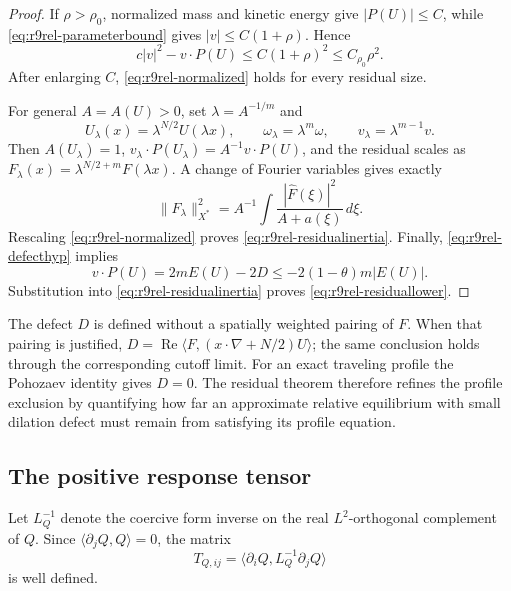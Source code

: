 \begin{proof}
If $\rho>\rho_0$, normalized mass and kinetic energy give
$|P(U)|\le C$, while \eqref{eq:r9rel-parameterbound} gives
$|v|\le C(1+\rho)$. Hence
\[
 c|v|^2-v\cdot P(U)\le C(1+\rho)^2
 \le C_{\rho_0}\rho^2.
\]
After enlarging $C$, \eqref{eq:r9rel-normalized} holds for every
residual size.

For general $A=A(U)>0$, set $\lambda=A^{-1/m}$ and
\[
 U_\lambda(x)=\lambda^{N/2}U(\lambda x),\qquad
 \omega_\lambda=\lambda^m\omega,\qquad
 v_\lambda=\lambda^{m-1}v.
\]
Then $A(U_\lambda)=1$,
$v_\lambda\cdot P(U_\lambda)=A^{-1}v\cdot P(U)$, and the
residual scales as
$F_\lambda(x)=\lambda^{N/2+m}F(\lambda x)$.
A change of Fourier variables gives exactly
\[
 \|F_\lambda\|_{X^*}^2
 =A^{-1}\int\frac{|\widehat F(\xi)|^2}{A+a(\xi)}\,d\xi.
\]
Rescaling \eqref{eq:r9rel-normalized} proves
\eqref{eq:r9rel-residualinertia}. Finally,
\eqref{eq:r9rel-defecthyp} implies
\[
 v\cdot P(U)=2mE(U)-2D
 \le-2(1-\theta)m|E(U)|.
\]
Substitution into \eqref{eq:r9rel-residualinertia} proves
\eqref{eq:r9rel-residuallower}.
\end{proof}

\begin{remark}
The defect $D$ is defined without a spatially weighted pairing of
$F$. When that pairing is justified,
$D=\operatorname{Re}\langle F,(x\cdot\nabla+N/2)U\rangle$;
the same conclusion holds through the corresponding cutoff limit.
For an exact traveling profile the Pohozaev identity gives $D=0$.
The residual theorem therefore refines the profile exclusion by
quantifying how far an approximate relative equilibrium with small
dilation defect must remain from satisfying its profile equation.
\end{remark}

\subsection{The positive response tensor}

Let $L_Q^{-1}$ denote the coercive form inverse on the real
$L^2$-orthogonal complement of $Q$. Since
$\langle\partial_jQ,Q\rangle=0$, the matrix
\begin{equation}\label{eq:r9rel-tensor}
 T_{Q,ij}=\langle\partial_iQ,L_Q^{-1}\partial_jQ\rangle
\end{equation}
is well defined.

